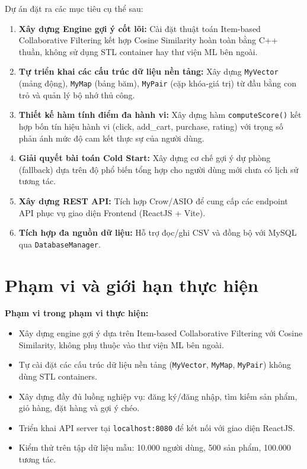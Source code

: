 \documentclass{report}
\begin{document}
Dự án đặt ra các mục tiêu cụ thể sau:

\begin{enumerate}
    \item \textbf{Xây dựng Engine gợi ý cốt lõi:} Cài đặt thuật toán Item-based Collaborative Filtering kết hợp Cosine Similarity hoàn toàn bằng C++ thuần, không sử dụng STL container hay thư viện ML bên ngoài.
    \item \textbf{Tự triển khai các cấu trúc dữ liệu nền tảng:} Xây dựng \texttt{MyVector} (mảng động), \texttt{MyMap} (bảng băm), \texttt{MyPair} (cặp khóa-giá trị) từ đầu bằng con trỏ và quản lý bộ nhớ thủ công.
    \item \textbf{Thiết kế hàm tính điểm đa hành vi:} Xây dựng hàm \texttt{computeScore()} kết hợp bốn tín hiệu hành vi (click, add\_cart, purchase, rating) với trọng số phản ánh mức độ cam kết thực sự của người dùng.
    \item \textbf{Giải quyết bài toán Cold Start:} Xây dựng cơ chế gợi ý dự phòng (fallback) dựa trên độ phổ biến tổng hợp cho người dùng mới chưa có lịch sử tương tác.
    \item \textbf{Xây dựng REST API:} Tích hợp Crow/ASIO để cung cấp các endpoint API phục vụ giao diện Frontend (ReactJS + Vite).
    \item \textbf{Tích hợp đa nguồn dữ liệu:} Hỗ trợ đọc/ghi CSV và đồng bộ với MySQL qua \texttt{DatabaseManager}.
\end{enumerate}

\section{Phạm vi và giới hạn thực hiện}

\textbf{Phạm vi trong phạm vi thực hiện:}
\begin{itemize}
    \item Xây dựng engine gợi ý dựa trên Item-based Collaborative Filtering với Cosine Similarity, không phụ thuộc vào thư viện ML bên ngoài.
    \item Tự cài đặt các cấu trúc dữ liệu nền tảng (\texttt{MyVector}, \texttt{MyMap}, \texttt{MyPair}) không dùng STL containers.
    \item Xây dựng đầy đủ luồng nghiệp vụ: đăng ký/đăng nhập, tìm kiếm sản phẩm, giỏ hàng, đặt hàng và gợi ý chéo.
    \item Triển khai API server tại \texttt{localhost:8080} để kết nối với giao diện ReactJS.
    \item Kiểm thử trên tập dữ liệu mẫu: 10.000 người dùng, 500 sản phẩm, 100.000 tương tác.
\end{itemize}
\end{document}
